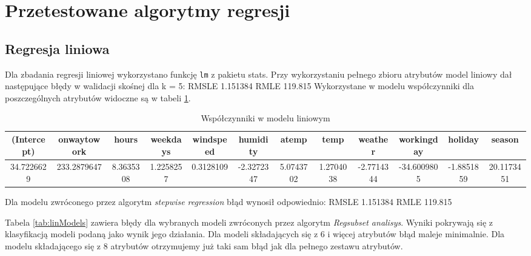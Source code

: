 \documentclass[a4paper,12pt]{article}
\begin{document}
    
\section{Przetestowane algorytmy regresji}

   \subsection{Regresja liniowa}
       Dla zbadania regresji liniowej wykorzystano funkcję \texttt{lm} z pakietu {stats}.
       Przy wykorzystaniu pełnego zbioru atrybutów model liniowy dał następujące błędy w walidacji skośnej dla k = 5:
       RMSLE 1.151384
       RMLE 119.815
        Wykorzystane w modelu współczynniki dla poszczególnych atrybutów widoczne są w tabeli \ref{tab:wspolczynnikiLin}.
        
            \begin{table}
                \begin{tabular}{|c|c|c|c|c|c|c|c|c|c|c|c|}
                    \hline 
                    (Intercept) & onwaytowork & hours & weekdays & windspeed & humidity & atemp & temp & weather & workingday & holiday & season \\ 
                    \hline 
                    34.7226629 & 233.2879647 & 8.3635308 & 1.2258257 & 0.3128109 & -2.3272347 & 5.0743702 & 1.2704038 & -2.7714344 & -34.6009805 & -1.8851859 & 20.1173451 \\ 
                    \hline 
                \end{tabular}
                \caption{Współczynniki w modelu liniowym}
                \label{tab:wspolczynnikiLin}
        \end{table}  
        
        Dla modelu zwróconego przez algorytm \textit{stepwise regression} błąd wynosił odpowiednio:
        RMSLE 1.151384
        RMLE 119.815
        
        Tabela \ref{tab:linModels} zawiera błędy dla wybranych modeli zwróconych przez algorytm \textit{Regsubset analisys}. Wyniki pokrywają się z klasyfikacją modeli podaną jako wynik jego działania. Dla modeli składających się z 6 i więcej atrybutów błąd maleje minimalnie. Dla modelu składającego się z 8 atrybutów otrzymujemy już taki sam błąd jak dla pełnego zestawu atrybutów.
        
\end{document}
